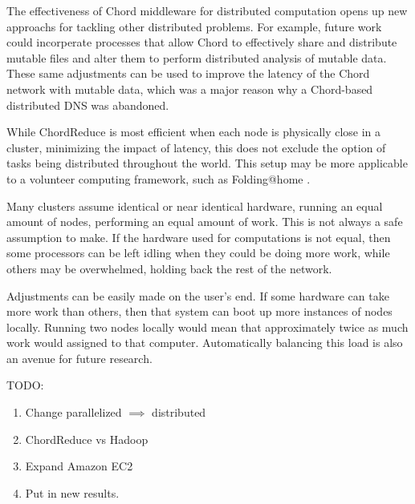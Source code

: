 \documentclass[10pt, conference, compsocconf]{IEEEtran}
\begin{document}
 
The effectiveness of Chord middleware for distributed computation opens up new approachs for tackling other distributed problems. For example, future work could incorperate processes that allow Chord to effectively share and distribute mutable files \cite{IRM} and alter them to perform distributed analysis of mutable data.  These same adjustments can be used to improve the latency of the Chord network with mutable data, which was a major reason why a Chord-based distributed DNS \cite{cox2002serving} was abandoned.  

While ChordReduce is most efficient when each node is physically close in a cluster, minimizing the impact of latency, this does not exclude the option of tasks being distributed throughout the world.  This setup may be more applicable to a volunteer computing framework, such as Folding@home \cite{folding}.

Many clusters assume identical or near identical hardware, running an equal amount of nodes, performing an equal amount of work. This is not always a safe assumption to make.  If the hardware used for computations is not equal, then some processors can be left idling when they could be doing more work, while others may be overwhelmed, holding back the rest of the network.

Adjustments can be easily made on the user's end.  If some hardware can take more work than others, then that system can boot up more instances of nodes locally. Running two nodes locally would mean that approximately twice as much work would assigned to that computer.  Automatically balancing this load is also an avenue for future research.




TODO:
\begin{enumerate}
    \item Change parallelized  $\implies$ distributed
    \item ChordReduce vs Hadoop
    \item Expand Amazon EC2
    \item Put in new results.
\end{enumerate}





\end{document}

